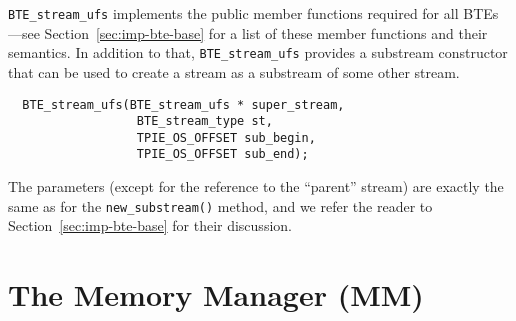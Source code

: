 \lstinline|BTE_stream_ufs| implements the public member functions
required for all BTEs---see Section~\ref{sec:imp-bte-base} for a list
of these member functions and their semantics. In addition to that,
\lstinline|BTE_stream_ufs| provides a substream constructor that can
be used to create a stream as a substream of some other stream. 
\begin{lstlisting}
  BTE_stream_ufs(BTE_stream_ufs * super_stream,
                  BTE_stream_type st, 
                  TPIE_OS_OFFSET sub_begin, 
                  TPIE_OS_OFFSET sub_end);
\end{lstlisting}

The parameters (except for the reference to the ``parent'' stream) are
exactly the same as for the \lstinline|new_substream()| method, and
we refer the reader to Section~\ref{sec:imp-bte-base} for their
discussion.




\section{The Memory Manager (MM)}

